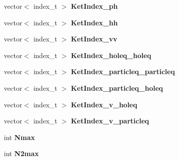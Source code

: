 \begin{DoxyCompactItemize}
\item 
\hypertarget{classModelSpace_ac9e07e40e307b3c0a2d9c2cb20089aa2}{vector$<$ index\-\_\-t $>$ {\bfseries Ket\-Index\-\_\-ph}}\label{classModelSpace_ac9e07e40e307b3c0a2d9c2cb20089aa2}

\item 
\hypertarget{classModelSpace_a1794fcc318be8b851c6b52f31a048175}{vector$<$ index\-\_\-t $>$ {\bfseries Ket\-Index\-\_\-hh}}\label{classModelSpace_a1794fcc318be8b851c6b52f31a048175}

\item 
\hypertarget{classModelSpace_a523804668cdb8578187ebb585b81a8ba}{vector$<$ index\-\_\-t $>$ {\bfseries Ket\-Index\-\_\-vv}}\label{classModelSpace_a523804668cdb8578187ebb585b81a8ba}

\item 
\hypertarget{classModelSpace_a89fc44798d8d364877270df7c1e8d9cd}{vector$<$ index\-\_\-t $>$ {\bfseries Ket\-Index\-\_\-holeq\-\_\-holeq}}\label{classModelSpace_a89fc44798d8d364877270df7c1e8d9cd}

\item 
\hypertarget{classModelSpace_a9379290c72fcee45f8a896e3a64bb236}{vector$<$ index\-\_\-t $>$ {\bfseries Ket\-Index\-\_\-particleq\-\_\-particleq}}\label{classModelSpace_a9379290c72fcee45f8a896e3a64bb236}

\item 
\hypertarget{classModelSpace_a8bf6711b19a26f060481ea9fb0177f84}{vector$<$ index\-\_\-t $>$ {\bfseries Ket\-Index\-\_\-particleq\-\_\-holeq}}\label{classModelSpace_a8bf6711b19a26f060481ea9fb0177f84}

\item 
\hypertarget{classModelSpace_a4a1e1906a7f67ea2057502b36b2f7aaf}{vector$<$ index\-\_\-t $>$ {\bfseries Ket\-Index\-\_\-v\-\_\-holeq}}\label{classModelSpace_a4a1e1906a7f67ea2057502b36b2f7aaf}

\item 
\hypertarget{classModelSpace_a81670303894fb12b6da2cb17927f37a9}{vector$<$ index\-\_\-t $>$ {\bfseries Ket\-Index\-\_\-v\-\_\-particleq}}\label{classModelSpace_a81670303894fb12b6da2cb17927f37a9}

\item 
\hypertarget{classModelSpace_aa049d819d4d18cfb466777581cc349d2}{int {\bfseries Nmax}}\label{classModelSpace_aa049d819d4d18cfb466777581cc349d2}

\item 
\hypertarget{classModelSpace_a60db71713d3964af214756163ba0585e}{int {\bfseries N2max}}\label{classModelSpace_a60db71713d3964af214756163ba0585e}


\end{DoxyCompactItemize}
